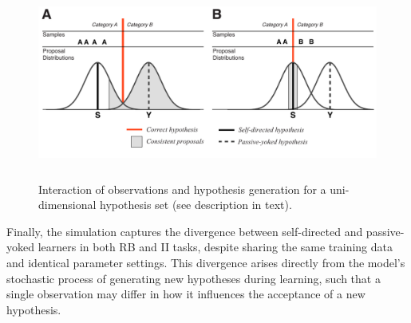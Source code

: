\documentclass[3p,twocolumn,authoryear,10pt]{elsarticle}
\begin{document}
\begin{figure}[t]
\centerline{\includegraphics[height=2.5in]{figures/search.pdf}}
\caption{Interaction of observations and hypothesis generation for a uni-dimensional hypothesis set (see description in text).
}
\label{model.fig}
\end{figure} 


Finally, the simulation captures the divergence between self-directed and passive-yoked learners in both RB and II tasks, despite sharing the same training data and identical parameter settings. This divergence arises directly from the model's stochastic process of generating new hypotheses during learning, such that a single observation may differ in how it influences the acceptance of a new hypothesis. 
\end{document}

